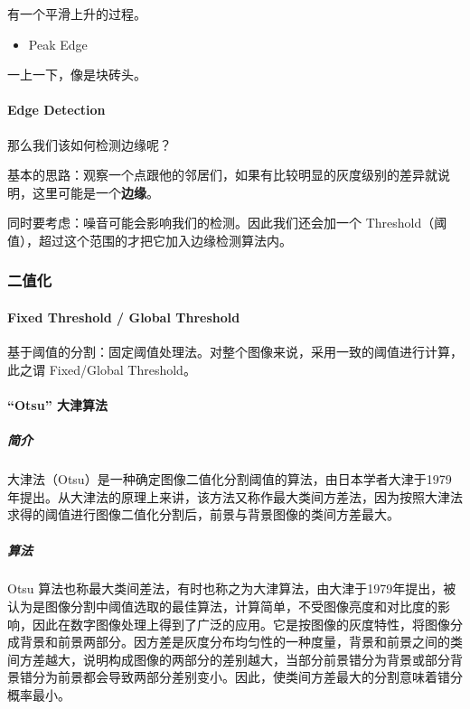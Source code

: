 \documentclass[
]{article}
\begin{document}
有一个平滑上升的过程。

\begin{itemize}
\item
  Peak Edge
\end{itemize}

一上一下，像是块砖头。

\hypertarget{header-n75}{%
\paragraph{Edge Detection}\label{header-n75}}

那么我们该如何检测边缘呢？

基本的思路：观察一个点跟他的邻居们，如果有比较明显的灰度级别的差异就说明，这里可能是一个\textbf{边缘}。

同时要考虑：噪音可能会影响我们的检测。因此我们还会加一个
Threshold（阈值），超过这个范围的才把它加入边缘检测算法内。

\hypertarget{header-n79}{%
\subsubsection{二值化}\label{header-n79}}

\hypertarget{header-n80}{%
\paragraph{Fixed Threshold / Global Threshold}\label{header-n80}}

基于阈值的分割：固定阈值处理法。对整个图像来说，采用一致的阈值进行计算，此之谓
Fixed/Global Threshold。

\hypertarget{header-n82}{%
\paragraph{``Otsu'' 大津算法}\label{header-n82}}

\hypertarget{header-n83}{%
\subparagraph{简介}\label{header-n83}}

大津法（Otsu）是一种确定图像二值化分割阈值的算法，由日本学者大津于1979年提出。从大津法的原理上来讲，该方法又称作最大类间方差法，因为按照大津法求得的阈值进行图像二值化分割后，前景与背景图像的类间方差最大。

\hypertarget{header-n85}{%
\subparagraph{算法}\label{header-n85}}

Otsu
算法也称最大类间差法，有时也称之为大津算法，由大津于1979年提出，被认为是图像分割中阈值选取的最佳算法，计算简单，不受图像亮度和对比度的影响，因此在数字图像处理上得到了广泛的应用。它是按图像的灰度特性，将图像分成背景和前景两部分。因方差是灰度分布均匀性的一种度量，背景和前景之间的类间方差越大，说明构成图像的两部分的差别越大，当部分前景错分为背景或部分背景错分为前景都会导致两部分差别变小。因此，使类间方差最大的分割意味着错分概率最小。
\end{document}
